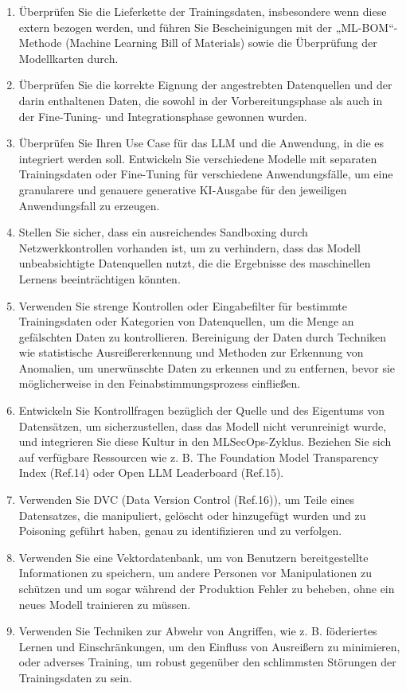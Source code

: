 \documentclass[
]{article}
\providecommand{\tightlist}{%
  \setlength{\itemsep}{0pt}\setlength{\parskip}{0pt}}
\begin{document}
\begin{enumerate}
\def\labelenumi{\arabic{enumi}.}
\tightlist
\item
  Überprüfen Sie die Lieferkette der Trainingsdaten, insbesondere wenn
  diese extern bezogen werden, und führen Sie Bescheinigungen mit der
  „ML-BOM``-Methode (Machine Learning Bill of Materials) sowie die
  Überprüfung der Modellkarten durch.
\item
  Überprüfen Sie die korrekte Eignung der angestrebten Datenquellen und
  der darin enthaltenen Daten, die sowohl in der Vorbereitungsphase als
  auch in der Fine-Tuning- und Integrationsphase gewonnen wurden.
\item
  Überprüfen Sie Ihren Use Case für das LLM und die Anwendung, in die es
  integriert werden soll. Entwickeln Sie verschiedene Modelle mit
  separaten Trainingsdaten oder Fine-Tuning für verschiedene
  Anwendungsfälle, um eine granularere und genauere generative
  KI-Ausgabe für den jeweiligen Anwendungsfall zu erzeugen.
\item
  Stellen Sie sicher, dass ein ausreichendes Sandboxing durch
  Netzwerkkontrollen vorhanden ist, um zu verhindern, dass das Modell
  unbeabsichtigte Datenquellen nutzt, die die Ergebnisse des
  maschinellen Lernens beeinträchtigen könnten.
\item
  Verwenden Sie strenge Kontrollen oder Eingabefilter für bestimmte
  Trainingsdaten oder Kategorien von Datenquellen, um die Menge an
  gefälschten Daten zu kontrollieren. Bereinigung der Daten durch
  Techniken wie statistische Ausreißererkennung und Methoden zur
  Erkennung von Anomalien, um unerwünschte Daten zu erkennen und zu
  entfernen, bevor sie möglicherweise in den Feinabstimmungsprozess
  einfließen.
\item
  Entwickeln Sie Kontrollfragen bezüglich der Quelle und des Eigentums
  von Datensätzen, um sicherzustellen, dass das Modell nicht
  verunreinigt wurde, und integrieren Sie diese Kultur in den
  MLSecOps-Zyklus. Beziehen Sie sich auf verfügbare Ressourcen wie z. B.
  The Foundation Model Transparency Index (Ref.14) oder Open LLM
  Leaderboard (Ref.15).
\item
  Verwenden Sie DVC (Data Version Control (Ref.16)), um Teile eines
  Datensatzes, die manipuliert, gelöscht oder hinzugefügt wurden und zu
  Poisoning geführt haben, genau zu identifizieren und zu verfolgen.
\item
  Verwenden Sie eine Vektordatenbank, um von Benutzern bereitgestellte
  Informationen zu speichern, um andere Personen vor Manipulationen zu
  schützen und um sogar während der Produktion Fehler zu beheben, ohne
  ein neues Modell trainieren zu müssen.
\item
  Verwenden Sie Techniken zur Abwehr von Angriffen, wie z. B.
  föderiertes Lernen und Einschränkungen, um den Einfluss von Ausreißern
  zu minimieren, oder adverses Training, um robust gegenüber den
  schlimmsten Störungen der Trainingsdaten zu sein.
\end{enumerate}
\end{document}

